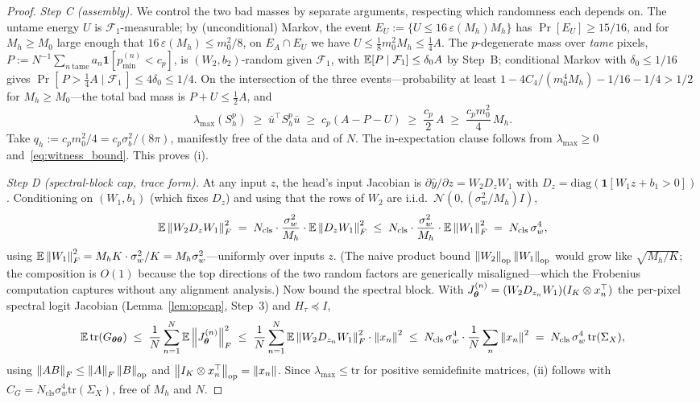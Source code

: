\begin{proof}
\emph{Step C (assembly).} We control the two bad masses by separate
arguments, respecting which randomness each depends on. The untame
energy $U$ is $\mathcal{F}_1$-measurable; by (unconditional) Markov,
the event $E_U := \{ U \leq 16\, \varepsilon(M_h) M_h \}$ has
$\Pr[E_U] \geq 15/16$, and for $M_h \geq M_0$ large enough that
$16\, \varepsilon(M_h) \leq m_0^2/8$, on $E_A \cap E_U$ we have
$U \leq \tfrac{1}{8} m_0^2 M_h \leq \tfrac{1}{4} A$. The
$p$-degenerate mass over \emph{tame} pixels,
$P := N^{-1} \sum_{n\ \mathrm{tame}}
a_n \mathbf{1}[p^{(n)}_{\min} < c_p]$, is
$(W_2, b_2)$-random given $\mathcal{F}_1$, with
$\mathbb{E}[P \mid \mathcal{F}_1] \leq \delta_0 A$ by Step~B; conditional
Markov with $\delta_0 \leq 1/16$ gives
$\Pr[\, P > \tfrac{1}{4} A \mid \mathcal{F}_1 \,] \leq 4\delta_0
\leq 1/4$. On the intersection of the three events---probability at
least $1 - 4 C_4/(m_0^4 M_h) - 1/16 - 1/4 > 1/2$ for
$M_h \geq M_0$---the total bad mass is $P + U \leq \tfrac{1}{2} A$,
and
\[
    \lambda_{\max}(S_h^{p})
    \;\geq\; \bar{u}^\top S_h^{p} \bar{u}
    \;\geq\; c_p \left( A - P - U \right)
    \;\geq\; \frac{c_p}{2}\, A
    \;\geq\; \frac{c_p m_0^2}{4}\, M_h .
\]
Take $q_h := c_p m_0^2 / 4 = c_p \sigma_b^2 / (8\pi)$, manifestly
free of the data and of $N$. The in-expectation clause follows from
$\lambda_{\max} \geq 0$ and~\eqref{eq:witness_bound}. This proves
(i).

\emph{Step D (spectral-block cap, trace form).} At any input $z$,
the head's input Jacobian is $\partial \hat{y}/\partial z = W_2 D_z
W_1$ with $D_z = \mathrm{diag}(\mathbf{1}[W_1 z + b_1 > 0])$.
Conditioning on $(W_1, b_1)$ (which fixes $D_z$) and using that the
rows of $W_2$ are i.i.d.\ $\mathcal{N}(0, (\sigma_w^2/M_h) I)$,
\[
    \mathbb{E} \left\lVert W_2 D_z W_1\right\rVert_F^2
    \;=\; N_{\mathrm{cls}} \cdot \frac{\sigma_w^2}{M_h}
        \cdot \mathbb{E} \left\lVert D_z W_1\right\rVert_F^2
    \;\leq\; N_{\mathrm{cls}} \cdot \frac{\sigma_w^2}{M_h}
        \cdot \mathbb{E} \left\lVert W_1\right\rVert_F^2
    \;=\; N_{\mathrm{cls}}\, \sigma_w^4 ,
\]
using $\mathbb{E}\left\lVert W_1\right\rVert_F^2 = M_h K \cdot \sigma_w^2/K = M_h
\sigma_w^2$---uniformly over inputs $z$. (The naive product bound
$\left\lVert W_2\right\rVert_{\mathrm{op}} \left\lVert W_1\right\rVert_{\mathrm{op}}$
would grow like $\sqrt{M_h/K}$; the composition is $O(1)$ because
the top directions of the two random factors are generically
misaligned---which the Frobenius computation captures without any
alignment analysis.) Now bound the spectral block. With
$J_{\boldsymbol{\theta}}^{(n)} = (W_2 D_{z_n} W_1)(I_K \otimes x_n^\top)$ the
per-pixel spectral logit Jacobian
(Lemma~\ref{lem:opcap}, Step~3) and $H_\tau \preceq I$,
\[
    \mathbb{E}\,\mathrm{tr}(G_{{\boldsymbol{\theta}}{\boldsymbol{\theta}}})
    \;\leq\; \frac{1}{N} \sum_{n=1}^{N}
        \mathbb{E} \left\lVert J_{\boldsymbol{\theta}}^{(n)}\right\rVert_F^2
    \;\leq\; \frac{1}{N} \sum_{n=1}^{N}
        \mathbb{E} \left\lVert W_2 D_{z_n} W_1\right\rVert_F^2 \cdot \left\lVert x_n\right\rVert^2
    \;\leq\; N_{\mathrm{cls}}\, \sigma_w^4 \cdot
        \frac{1}{N} \sum_n \left\lVert x_n\right\rVert^2
    \;=\; N_{\mathrm{cls}}\, \sigma_w^4\, \mathrm{tr}(\Sigma_X),
\]
using $\left\lVert AB\right\rVert_F \leq \left\lVert A\right\rVert_F \left\lVert B\right\rVert_{\mathrm{op}}$ and
$\left\lVert I_K \otimes x_n^\top\right\rVert_{\mathrm{op}} = \left\lVert x_n\right\rVert$. Since
$\lambda_{\max} \leq \mathrm{tr}$ for positive semidefinite
matrices, (ii) follows with $C_G = N_{\mathrm{cls}} \sigma_w^4
\mathrm{tr}(\Sigma_X)$, free of $M_h$ and $N$.


\end{proof}
